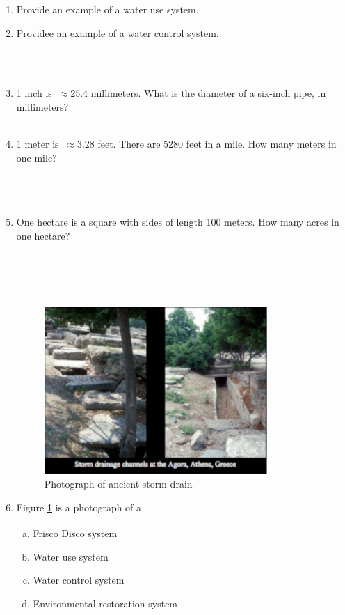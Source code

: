 \documentclass[11pt]{article}
\begin{document}


\begin{enumerate}
\item Provide an example of a water use system.
\item Providee an example of a water control system.


~\\
~\\
\item 1 inch is $~\approx 25.4$ millimeters.  What is the diameter of a six-inch pipe, in millimeters?
~\\
~\\
\item 1 meter is $~\approx 3.28$ feet.   There are 5280 feet in a mile.   How many meters in one mile?
~\\
~\\
~\\
~\\
\item One hectare is a square with sides of length 100 meters.  How many acres in one hectare?
~\\
~\\
~\\
~\\
~\\
\begin{figure}[h!] %
   \centering
   \includegraphics[height=2.5in]{greek-storm-drain.pdf} 
   \caption{Photograph of ancient storm drain}
   \label{fig:greek-storm-drain}
\end{figure}
\item Figure \ref{fig:greek-storm-drain} is a photograph of a
\begin{enumerate}[(a)]
\item Frisco Disco\textsuperscript{\textcopyright{}} system
\item Water use system
\item Water control system
\item Environmental restoration system
\end{enumerate}


\end{enumerate}
\end{document}
